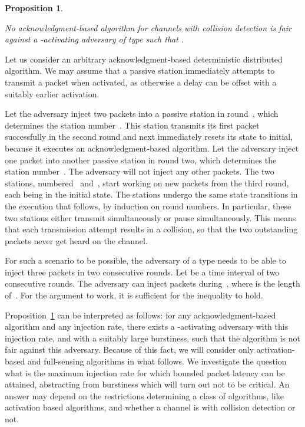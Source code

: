 \documentclass[11pt]{article}
\newcommand{\qed}{\hfill  \smallbreak}
\newenvironment{proof}{\noindent{\bf Proof:}}{\qed}
\newtheorem{proposition}{Proposition}
\begin{document}
\begin{proposition}
\label{pro:acknowledgment-impossibility}

No acknowledgment-based algorithm for channels with collision detection is fair against a -activating adversary of type  such that .
\end{proposition}

\begin{proof} 
Let us consider an arbitrary acknowledgment-based deterministic distributed algorithm.
We may assume that a passive station immediately attempts to transmit a packet when activated, as otherwise a delay can be offset with a suitably earlier activation.

Let the adversary inject two packets into a passive station in round~, which determines the station number~.
This station transmits its first packet successfully in the second round and next immediately resets its state to initial, because it executes an acknowledgment-based algorithm.
Let the adversary inject one packet into another passive station in round two, which determines the station number~.
The adversary will not inject any other packets.
The two stations, numbered~ and~, start working on new packets from the third round, each being in the initial state.
The stations undergo the same state transitions in the execution that follows,  by induction on round numbers.
In particular, these two stations either transmit simultaneously or pause simultaneously.
This means that each transmission attempt results in a collision, so that the two outstanding packets never get heard on the channel.

For such a scenario to be possible, the adversary of a type  needs to be able to inject three packets in two consecutive rounds.
Let  be a time interval of two consecutive rounds.
The adversary can inject  packets during~, where  is the length of~.
For the argument to work, it is sufficient for the inequality  to hold.
\end{proof} 

Proposition~\ref{pro:acknowledgment-impossibility} can be interpreted as follows: for any acknowledgment-based algorithm and any injection rate, there exists a -activating adversary with this injection rate, and with a suitably large burstiness, such that the algorithm is not fair against this adversary.
Because of this fact, we will consider only activation-based and full-sensing algorithms in what follows.
We investigate the question what is the maximum injection rate for which bounded packet latency can be attained, abstracting from burstiness which will turn out not to be critical. 
An answer may depend on the restrictions determining a class of algorithms, like activation based algorithms, and whether a channel is with collision detection or not.
\end{document}

